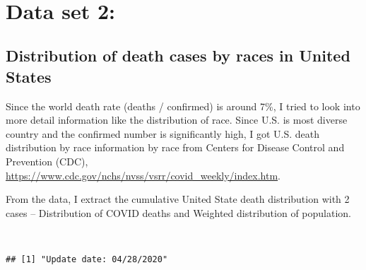 \documentclass[
  11pt,
]{article}
\begin{document}
~

\hypertarget{data-set-2}{%
\section{Data set 2:}\label{data-set-2}}

\hypertarget{distribution-of-death-cases-by-races-in-united-states}{%
\subsection{Distribution of death cases by races in United
States}\label{distribution-of-death-cases-by-races-in-united-states}}

Since the world death rate (deaths / confirmed) is around 7\%, I tried
to look into more detail information like the distribution of race.
Since U.S. is most diverse country and the confirmed number is
significantly high, I got U.S. death distribution by race information by
race from Centers for Disease Control and Prevention (CDC),
\url{https://www.cdc.gov/nchs/nvss/vsrr/covid_weekly/index.htm}.

From the data, I extract the cumulative United State death distribution
with 2 cases -- Distribution of COVID deaths and Weighted distribution
of population.

~

\begin{verbatim}
## [1] "Update date: 04/28/2020"
\end{verbatim}
\end{document}
